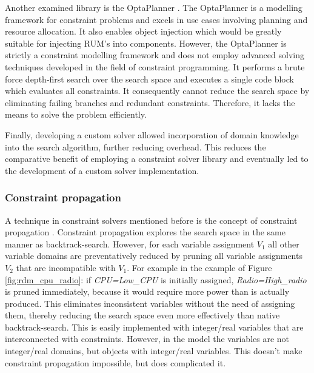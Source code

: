 Another examined library is the OptaPlanner \cite{web:opta}. The OptaPlanner is a modelling framework for constraint problems and excels in use cases involving planning and resource allocation. It also enables object injection which would be greatly suitable for injecting RUM's into components. However, the OptaPlanner is strictly a constraint modelling framework and does not employ advanced solving techniques developed in the field of constraint programming. It performs a brute force depth-first search over the search space and executes a single code block which evaluates all constraints. It consequently cannot reduce the search space by eliminating failing branches and redundant constraints. Therefore, it lacks the means to solve the problem efficiently.

Finally, developing a custom solver allowed incorporation of domain knowledge into the search algorithm, further reducing overhead. This reduces the comparative benefit of employing a constraint solver library and eventually led to the development of a custom solver implementation.

\subsubsection{Constraint propagation}
A technique in constraint solvers mentioned before is the concept of constraint propagation \cite{constraint_general}. Constraint propagation explores the search space in the same manner as backtrack-search. However, for each variable assignment $V_1$ all other variable domains are preventatively reduced by pruning all variable assignments $V_2$ that are incompatible with $V_1$. For example in the example of Figure \ref{fig:rdm_cpu_radio}: if \emph{CPU=Low\_CPU} is initially assigned, \emph{Radio=High\_radio} is pruned immediately, because it would require more power than is actually produced. This eliminates inconsistent variables without the need of assigning them, thereby reducing the search space even more effectively than native backtrack-search. This is easily implemented with integer/real variables that are interconnected with constraints. However, in the model the variables are not integer/real domains, but objects with integer/real variables. This doesn't make constraint propagation impossible, but does complicated it.

